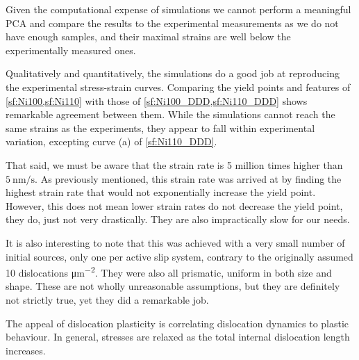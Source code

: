 Given the computational expense of simulations we cannot perform a meaningful PCA and compare the results to the experimental measurements as we do not have enough samples, and their maximal strains are well below the experimentally measured ones.

Qualitatively and quantitatively, the simulations do a good job at reproducing the experimental stress-strain curves. Comparing the yield points and features of \cref{sf:Ni100,sf:Ni110} with those of \cref{sf:Ni100_DDD,sf:Ni110_DDD} shows remarkable agreement between them. While the simulations cannot reach the same strains as the experiments, they appear to fall within experimental variation, excepting curve (a) of \cref{sf:Ni110_DDD}.

That said, we must be aware that the strain rate is 5 million times higher than $\SI{5}{\nano\meter\per\second}$. As previously mentioned, this strain rate was arrived at by finding the highest strain rate that would not exponentially increase the yield point. However, this does not mean lower strain rates do not decrease the yield point, they do, just not very drastically. They are also impractically slow for our needs.

It is also interesting to note that this was achieved with a very small number of initial sources, only one per active slip system, contrary to the originally assumed 10 dislocations \si{\micro\metre^{-2}}. They were also all prismatic, uniform in both size and shape. These are not wholly unreasonable assumptions, but they are definitely not strictly true, yet they did a remarkable job.

The appeal of dislocation plasticity is correlating dislocation dynamics to plastic behaviour. In general, stresses are relaxed as the total internal dislocation length increases.

